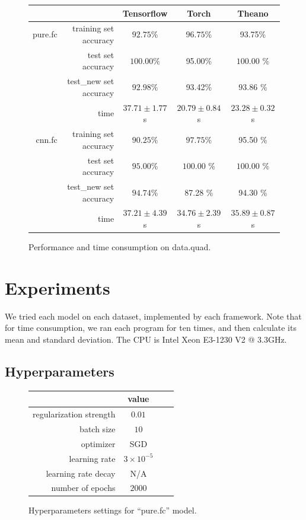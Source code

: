 \documentclass[a4paper]{article}
\begin{document}
\begin{figure}[H]
\centering
\begin{tabular}{|r|r|c|c|c|}
\hline
 & & Tensorflow & Torch & Theano \\
\hline
pure.fc & training set accuracy & $92.75\%$ & $\bm{96.75}$\% & 93.75\% \\
 & test set accuracy & $\bm{100.00}\%$ & 95.00\% & $\bm{100.00}$ \% \\
 & test\_new set accuracy & $92.98\%$ & 93.42\% & $\bm{93.86}$ \% \\
 & time & $37.71\pm1.77$s & $\bm{20.79 \pm 0.84}$ s & $23.28 \pm 0.32$s\\
\hline
cnn.fc & training set accuracy & $90.25\%$ & $\bm{97.75}$\% & 95.50 \% \\
 & test set accuracy & $95.00\%$ & $\bm{100.00}$ \% & $\bm{100.00}$ \% \\
 & test\_new set accuracy & $\bm{94.74}\%$ & 87.28 \% & 94.30 \% \\
 & time & $37.21\pm4.39$s & $\bm{34.76 \pm 2.39}$ s & $ 35.89 \pm 0.87$ s\\
\hline
\end{tabular}
\caption{Performance and time consumption on data.quad.}
\end{figure}

\section{Experiments}

We tried each model on each dataset, implemented by each framework.
Note that for time consumption, we ran each program for ten times, and then calculate its mean and standard deviation.
The CPU is Intel Xeon E3-1230 V2 @ 3.3GHz.

\subsection{Hyperparameters}

\begin{figure}[H]
\centering
\begin{tabular}{|r|c|c|c|}
\hline
 & value \\
\hline
regularization strength & $0.01$ \\
\hline
batch size & $10$ \\
\hline
optimizer & SGD \\
\hline
learning rate & $3\times10^{-5}$\\
\hline
learning rate decay & N/A \\
\hline
number of epochs & $2000$ \\
\hline
\end{tabular}
\caption{Hyperparameters settings for ``pure.fc'' model.}
\end{figure}
\end{document}
